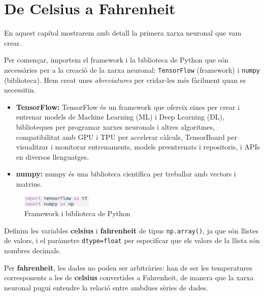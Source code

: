 \chapter{De Celsius a Fahrenheit}\label{a:CelsiusFahrenheit}

En aquest capítol mostrarem amb detall la primera xarxa neuronal que vam crear.

Per començar, importem el framework i la biblioteca de Python que són necessàries per a la creació de la xarxa neuronal: \texttt{TensorFlow} (framework) i \texttt{numpy} (biblioteca). Hem creat unes \textit{abreviatures} per cridar-les més fàcilment quan es necessitin.

\begin{itemize}

\item \textbf{TensorFlow: } TensorFlow és un framework que ofereix eines per crear i entrenar models de Machine Learning (ML) i Deep Learning (DL), biblioteques per programar xarxes neuronals i altres algoritmes, compatibilitat amb GPU i TPU per accelerar càlculs, TensorBoard per visualitzar i monitorar entrenaments, models preentrenats i repositoris, i APIs en diversos llenguatges.

\item \textbf{numpy: } numpy és una biblioteca científica per treballar amb vectors i matrius.

\end{itemize}

\begin{figure}[H]

\centering

\includegraphics[width=0.3\textwidth]{./figures/1.png}

\caption{Framework i biblioteca de Python}

\end{figure}

Definim les variables \textbf{celsius} i \textbf{fahrenheit} de tipus \texttt{np.array()}, ja que són llistes de valors, i el paràmetre \texttt{dtype=float} per especificar que els valors de la llista són nombres decimals.

Per \textbf{fahrenheit}, les dades no poden ser arbitràries: han de ser les temperatures corresponents a les de \textbf{celsius} convertides a Fahrenheit, de manera que la xarxa neuronal pugui entendre la relació entre ambdues sèries de dades.

